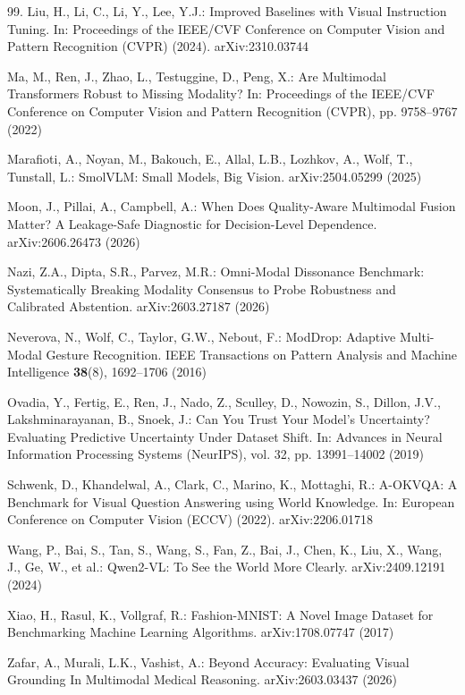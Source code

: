 \documentclass[graybox]{svmult}
\begin{document}
\begin{thebibliography}{99.}
Liu, H., Li, C., Li, Y., Lee, Y.J.: Improved Baselines with Visual Instruction Tuning. In: Proceedings of the IEEE/CVF Conference on Computer Vision and Pattern Recognition (CVPR) (2024). arXiv:2310.03744

Ma, M., Ren, J., Zhao, L., Testuggine, D., Peng, X.: Are Multimodal Transformers Robust to Missing Modality? In: Proceedings of the IEEE/CVF Conference on Computer Vision and Pattern Recognition (CVPR), pp. 9758--9767 (2022)

Marafioti, A., Noyan, M., Bakouch, E., Allal, L.B., Lozhkov, A., Wolf, T., Tunstall, L.: {SmolVLM}: Small Models, Big Vision. arXiv:2504.05299 (2025)

Moon, J., Pillai, A., Campbell, A.: When Does Quality-Aware Multimodal Fusion Matter? A Leakage-Safe Diagnostic for Decision-Level Dependence. arXiv:2606.26473 (2026)

Nazi, Z.A., Dipta, S.R., Parvez, M.R.: Omni-Modal Dissonance Benchmark: Systematically Breaking Modality Consensus to Probe Robustness and Calibrated Abstention. arXiv:2603.27187 (2026)

Neverova, N., Wolf, C., Taylor, G.W., Nebout, F.: {ModDrop}: Adaptive Multi-Modal Gesture Recognition. IEEE Transactions on Pattern Analysis and Machine Intelligence \textbf{38}(8), 1692--1706 (2016)

Ovadia, Y., Fertig, E., Ren, J., Nado, Z., Sculley, D., Nowozin, S., Dillon, J.V., Lakshminarayanan, B., Snoek, J.: Can You Trust Your Model's Uncertainty? Evaluating Predictive Uncertainty Under Dataset Shift. In: Advances in Neural Information Processing Systems (NeurIPS), vol. 32, pp. 13991--14002 (2019)

Schwenk, D., Khandelwal, A., Clark, C., Marino, K., Mottaghi, R.: {A-OKVQA}: A Benchmark for Visual Question Answering using World Knowledge. In: European Conference on Computer Vision (ECCV) (2022). arXiv:2206.01718

Wang, P., Bai, S., Tan, S., Wang, S., Fan, Z., Bai, J., Chen, K., Liu, X., Wang, J., Ge, W., et al.: {Qwen2-VL}: To See the World More Clearly. arXiv:2409.12191 (2024)

Xiao, H., Rasul, K., Vollgraf, R.: {Fashion-MNIST}: A Novel Image Dataset for Benchmarking Machine Learning Algorithms. arXiv:1708.07747 (2017)

Zafar, A., Murali, L.K., Vashist, A.: Beyond Accuracy: Evaluating Visual Grounding In Multimodal Medical Reasoning. arXiv:2603.03437 (2026)
\end{thebibliography}

% 
% 
\end{document}
